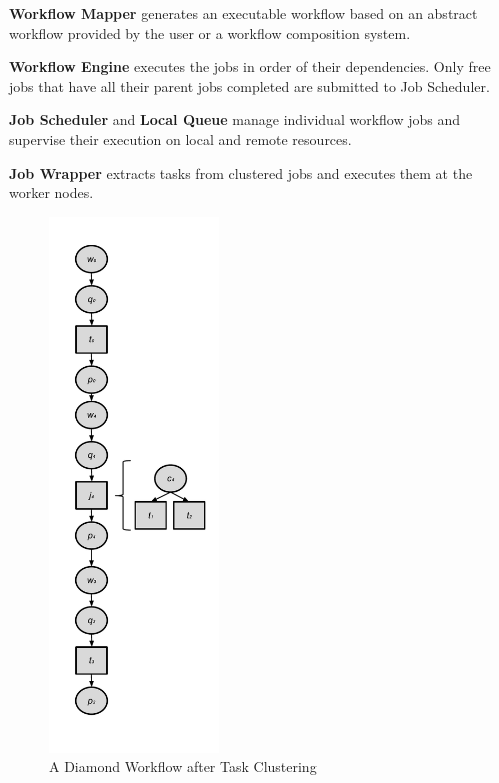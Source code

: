 \textbf{Workflow Mapper} generates an executable workflow based on an abstract workflow provided by the user or a workflow composition system. 

\textbf{Workflow Engine} executes the jobs in order of their dependencies. Only free jobs that have all their parent jobs completed are submitted to  Job Scheduler. 

\textbf{Job Scheduler} and \textbf{Local Queue} manage individual workflow jobs and supervise their execution on local and remote resources.

\textbf{Job Wrapper} extracts tasks from clustered jobs and executes them at the worker nodes. 


\begin{figure}[h!]
	\centering
    \includegraphics[width=0.4\textwidth]{figures/model/odag_after.pdf}
    \caption{ A Diamond Workflow after Task Clustering}
    \label{fig:model_odag_after}
\end{figure}



